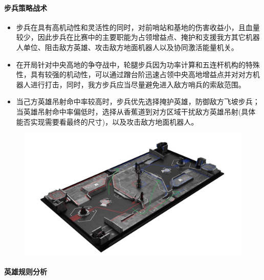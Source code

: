         \paragraph{步兵策略战术}
    
    
            \begin{itemize}
                \item 步兵在具有高机动性和灵活性的同时，对前哨站和基地的伤害收益小，且血量较少，因此步兵在比赛中的主要职能为占领增益点、掩护和支援我方其它机器人单位、阻击敌方英雄、攻击敌方地面机器人以及协同激活能量机关。
                \item 在开局针对中央高地的争夺战中，轮腿步兵因为功率计算和五连杆机构的特殊性，具有较强的机动性，可以通过蹭台阶迅速占领中央高地增益点并对对方机器人进行打击，同时，我方步兵应当尽量避免进入敌方哨兵的索敌范围。
                \item 当己方英雄吊射命中率较高时，步兵优先选择掩护英雄，防御敌方飞坡步兵；当英雄吊射命中率偏低时，选择从香蕉道到对方区域干扰敌方英雄吊射(具体能否实现需要看最终的尺寸)，以及攻击敌方地面机器人。
            \end{itemize}
    
            \begin{figure}[H]
                \centering
                \includegraphics[height=0.35\textwidth]{figure/infantry_tactics.png}
                \hspace{0.5em}
                \label{fig:infantry_tactics}
            \end{figure}

        \paragraph{英雄规则分析}

    
